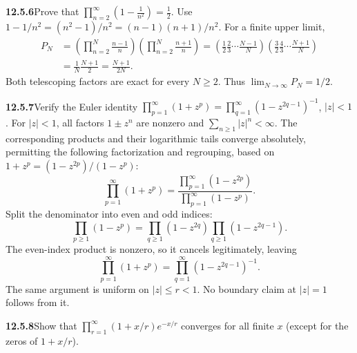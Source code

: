 \par\bigskip
\noindent\textbf{12.5.6}\quad Prove that
$\displaystyle\prod_{n=2}^{\infty}\left(1-\frac{1}{n^{2}}\right)=\frac{1}{2}$.
\solution
Use $1-1/n^2=(n^2-1)/n^2=(n-1)(n+1)/n^2$. For a finite upper limit,
\begin{align*}
P_N&=\left(\prod_{n=2}^N\frac{n-1}{n}\right)
    \left(\prod_{n=2}^N\frac{n+1}{n}\right)
=\left(\frac12\frac23\cdots\frac{N-1}{N}\right)
 \left(\frac32\frac43\cdots\frac{N+1}{N}\right)\\
&=\frac1N\frac{N+1}{2}=\frac{N+1}{2N}.
\end{align*}
Both telescoping factors are exact for every $N\ge2$.
Thus $\boxed{\lim_{N\to\infty}P_N=1/2}$.

\par\bigskip
\noindent\textbf{12.5.7}\quad Verify the Euler identity
$\displaystyle\prod_{p=1}^{\infty}(1+z^{p})
=\prod_{q=1}^{\infty}(1-z^{2q-1})^{-1}$, $|z| < 1$.
\solution
For $|z|<1$, all factors $1\pm z^n$ are nonzero and
$\sum_{n\ge1}|z|^n<\infty$. The corresponding products and their
logarithmic tails converge absolutely, permitting the following
factorization and regrouping, based on $1+z^p=(1-z^{2p})/(1-z^p)$:
\[
\prod_{p=1}^{\infty}(1+z^p)
=\frac{\prod_{p=1}^{\infty}(1-z^{2p})}
       {\prod_{p=1}^{\infty}(1-z^p)}.
\]
Split the denominator into even and odd indices:
\[
\prod_{p\ge1}(1-z^p)
=\prod_{q\ge1}(1-z^{2q})\prod_{q\ge1}(1-z^{2q-1}).
\]
The even-index product is nonzero, so it cancels legitimately, leaving
\[
\boxed{\prod_{p=1}^{\infty}(1+z^p)
=\prod_{q=1}^{\infty}(1-z^{2q-1})^{-1}}.
\]
The same argument is uniform on $|z|\le r<1$. No boundary claim at
$|z|=1$ follows from it.

\par\bigskip
\noindent\textbf{12.5.8}\quad Show that
$\prod_{r=1}^{\infty}(1+x/r)e^{-x/r}$ converges for all finite $x$ (except for
the zeros of $1+x/r$).

